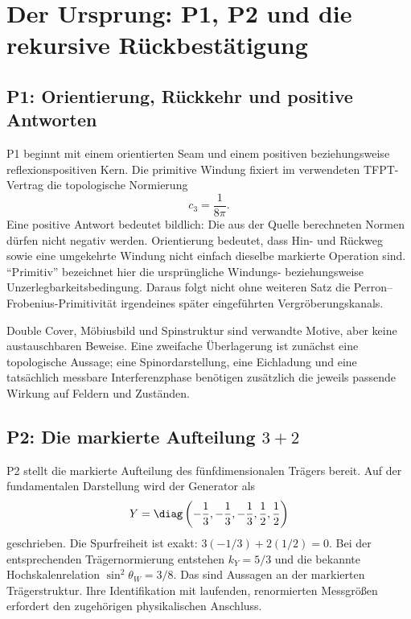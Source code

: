 \section{Der Ursprung: P1, P2 und die rekursive Rückbestätigung}

\subsection{P1: Orientierung, Rückkehr und positive Antworten}
P1 beginnt mit einem orientierten Seam und einem positiven beziehungsweise reflexionspositiven Kern. Die primitive Windung fixiert im verwendeten TFPT-Vertrag die topologische Normierung
\begin{equation}
c_3=\frac{1}{8\pi}.
\end{equation}
Eine positive Antwort bedeutet bildlich: Die aus der Quelle berechneten Normen dürfen nicht negativ werden. Orientierung bedeutet, dass Hin- und Rückweg sowie eine umgekehrte Windung nicht einfach dieselbe markierte Operation sind. ``Primitiv'' bezeichnet hier die ursprüngliche Windungs- beziehungsweise Unzerlegbarkeitsbedingung. Daraus folgt nicht ohne weiteren Satz die Perron--Frobenius-Primitivität irgendeines später eingeführten Vergröberungskanals.


Double Cover, Möbiusbild und Spinstruktur sind verwandte Motive, aber keine austauschbaren Beweise. Eine zweifache Überlagerung ist zunächst eine topologische Aussage; eine Spinordarstellung, eine Eichladung und eine tatsächlich messbare Interferenzphase benötigen zusätzlich die jeweils passende Wirkung auf Feldern und Zuständen.

\subsection{P2: Die markierte Aufteilung $3+2$}
P2 stellt die markierte Aufteilung des fünfdimensionalen Trägers bereit. Auf der fundamentalen Darstellung wird der Generator als
\begin{equation}
Y=\diag\left(-\frac13,-\frac13,-\frac13,\frac12,\frac12\right)
\end{equation}
geschrieben. Die Spurfreiheit ist exakt: $3(-1/3)+2(1/2)=0$. Bei der entsprechenden Trägernormierung entstehen $k_Y=5/3$ und die bekannte Hochskalenrelation $\sin^2\theta_W=3/8$. Das sind Aussagen an der markierten Trägerstruktur. Ihre Identifikation mit laufenden, renormierten Messgrößen erfordert den zugehörigen physikalischen Anschluss.

